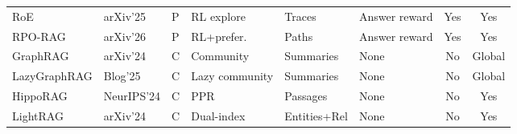 \documentclass[11pt]{article}
\begin{document}
\begin{table}[t]
\begin{tabular}{llllllcc}
RoE          & arXiv'25 & P & RL explore    & Traces       & Answer reward    & Yes & Yes \\
RPO-RAG      & arXiv'26 & P & RL+prefer.    & Paths        & Answer reward    & Yes & Yes \\
\midrule
GraphRAG     & arXiv'24 & C & Community      & Summaries    & None             & No  & Global \\
LazyGraphRAG & Blog'25  & C & Lazy community & Summaries    & None             & No  & Global \\
HippoRAG     & NeurIPS'24 & C & PPR            & Passages     & None             & No  & Yes \\
LightRAG     & arXiv'24 & C & Dual-index     & Entities+Rel & None             & No  & Yes \\
\bottomrule
\end{tabular}
\end{table}
\end{document}
